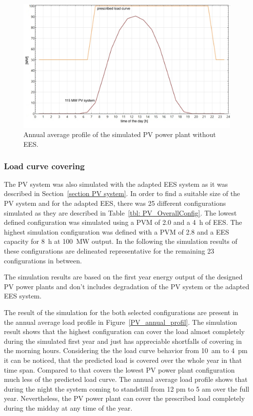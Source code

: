 \begin{figure}[htbp]  
\centering
\includegraphics[width=0.8\linewidth]{FIG/PVwhithoutEESanual}
\caption[Annual average profile of the simulated PV power plant without EES.]{Annual average profile of the simulated PV power plant without EES.}\label{PVwhithoutEESanual}
\end{figure}

\pagebreak
\subsubsection{Load curve covering}
The PV system was also simulated with the adapted EES system as it was described in Section~\ref{section PV system}. In order to find a suitable size of the PV system and for the adapted EES, there was 25 different configurations simulated as they are described in Table~\ref{tbl: PV_OverallConfig}. The lowest defined configuration was simulated using a PVM of 2.0 and a 4~h of EES. The highest simulation configuration was defined with a PVM of 2.8 and a EES capacity for 8~h at 100~MW output. In the following the simulation results of these configurations are delineated  representative for the remaining 23 configurations in between. 

The simulation results are based on the first year energy output of the designed PV power plants and don't includes degradation of the PV system or the adapted EES system. 

The result of the simulation for the both selected configurations are present in the annual average load profile in Figure~\ref{PV_annual_profil}. The simulation result shows that the highest configuration can cover the load almost completely during the simulated first year and just has appreciable shortfalls of covering in the morning hours. Considering the the load curve behavior from 10~am to 4~pm it can be noticed, that the predicted load is covered over the whole year in that time span. Compared to that covers the lowest PV power plant configuration much less of the predicted load curve. The  annual average load profile shows that during the night the system coming to standstill from 12 pm to 5 am over the full year. Nevertheless, the PV power plant can cover the prescribed load completely during the midday at any time of the year.

